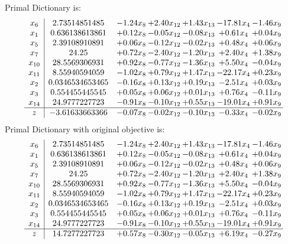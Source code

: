 \documentclass[9pt]{article}
\begin{document}
Primal Dictionary is:
\[\begin{array}{c| c c@{\hskip 2pt} c@{\hskip 2pt} c@{\hskip 2pt} c@{\hskip 2pt} c@{\hskip 2pt} }
 x_{6}   &  2.73514851485 & -1.24 x_{8} & +  2.40 x_{12} & +  1.43 x_{13} & -17.81 x_{4} & -1.46 x_{9}\\
 x_{1}   &  0.636138613861 & +  0.12 x_{8} & -0.05 x_{12} & -0.08 x_{13} & +  0.61 x_{4} & +  0.04 x_{9}\\
 x_{5}   &  2.39108910891 & +  0.06 x_{8} & -0.12 x_{12} & -0.02 x_{13} & +  0.48 x_{4} & +  0.06 x_{9}\\
 x_{7}   &  24.25 & +  0.72 x_{8} & -2.40 x_{12} & -1.20 x_{13} & +  2.40 x_{4} & +  1.38 x_{9}\\
 x_{10}   &  28.5569306931 & +  0.92 x_{8} & -0.77 x_{12} & -1.36 x_{13} & +  5.50 x_{4} & -0.04 x_{9}\\
 x_{11}   &  8.55940594059 & -1.02 x_{8} & +  0.79 x_{12} & +  1.47 x_{13} & -22.17 x_{4} & +  0.23 x_{9}\\
 x_{2}   &  0.0346534653465 & -0.16 x_{8} & +  0.13 x_{12} & +  0.19 x_{13} & -2.51 x_{4} & +  0.03 x_{9}\\
 x_{3}   &  0.554455445545 & +  0.05 x_{8} & +  0.06 x_{12} & +  0.01 x_{13} & +  0.76 x_{4} & -0.11 x_{9}\\
 x_{14}   &  24.9777227723 & -0.91 x_{8} & -0.10 x_{12} & +  0.55 x_{13} & -19.01 x_{4} & +  0.91 x_{9}\\
\hline
z    &  -3.61633663366 & -0.07 x_{8} & -0.02 x_{12} & -0.10 x_{13} & -0.33 x_{4} & -0.02 x_{9}\\
\end{array}\]
Primal Dictionary with original objective is:
\[\begin{array}{c| c c@{\hskip 2pt} c@{\hskip 2pt} c@{\hskip 2pt} c@{\hskip 2pt} c@{\hskip 2pt} }
 x_{6}   &  2.73514851485 & -1.24 x_{8} & +  2.40 x_{12} & +  1.43 x_{13} & -17.81 x_{4} & -1.46 x_{9}\\
 x_{1}   &  0.636138613861 & +  0.12 x_{8} & -0.05 x_{12} & -0.08 x_{13} & +  0.61 x_{4} & +  0.04 x_{9}\\
 x_{5}   &  2.39108910891 & +  0.06 x_{8} & -0.12 x_{12} & -0.02 x_{13} & +  0.48 x_{4} & +  0.06 x_{9}\\
 x_{7}   &  24.25 & +  0.72 x_{8} & -2.40 x_{12} & -1.20 x_{13} & +  2.40 x_{4} & +  1.38 x_{9}\\
 x_{10}   &  28.5569306931 & +  0.92 x_{8} & -0.77 x_{12} & -1.36 x_{13} & +  5.50 x_{4} & -0.04 x_{9}\\
 x_{11}   &  8.55940594059 & -1.02 x_{8} & +  0.79 x_{12} & +  1.47 x_{13} & -22.17 x_{4} & +  0.23 x_{9}\\
 x_{2}   &  0.0346534653465 & -0.16 x_{8} & +  0.13 x_{12} & +  0.19 x_{13} & -2.51 x_{4} & +  0.03 x_{9}\\
 x_{3}   &  0.554455445545 & +  0.05 x_{8} & +  0.06 x_{12} & +  0.01 x_{13} & +  0.76 x_{4} & -0.11 x_{9}\\
 x_{14}   &  24.9777227723 & -0.91 x_{8} & -0.10 x_{12} & +  0.55 x_{13} & -19.01 x_{4} & +  0.91 x_{9}\\
\hline
z    &  14.7277227723 & +  0.57 x_{8} & -0.30 x_{12} & -0.05 x_{13} & +  6.19 x_{4} & -0.27 x_{9}\\
\end{array}\]
\end{document}
